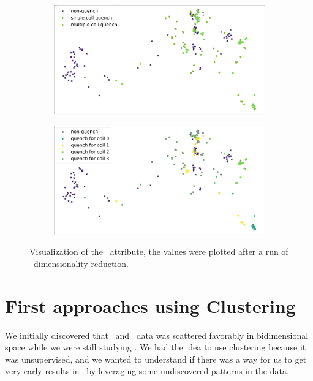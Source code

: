 \begin{figure}[!ht]
	\centering
	\begin{subfigure}{0.8\linewidth}
		\centering
		\includegraphics[width=\linewidth]{img/quench_dist_qlp/single_vs_multiple_Phi.png}
		\subcaption{}
	\end{subfigure}
	\begin{subfigure}{0.8\linewidth}
		\centering
		\includegraphics[width=\linewidth]{img/quench_dist_qlp_phi.png}
		\subcaption{}
	\end{subfigure}
	\caption{Visualization of the \phin\ attribute, the values were plotted after a run of \pca\
		dimensionality reduction.}
	\label{fig:phi-coilq-dist}
\end{figure}

\section{First approaches using Clustering}
\label{sec:qlp-cluster}
We initially discovered that \an\ and \cnmod\ data was scattered favorably in bidimensional space
while we were still studying \qrp. We had the idea to use clustering because it was unsupervised,
and we wanted to understand if there was a way for us to get very early results in \qlp\ by
leveraging some undiscovered patterns in the data.

